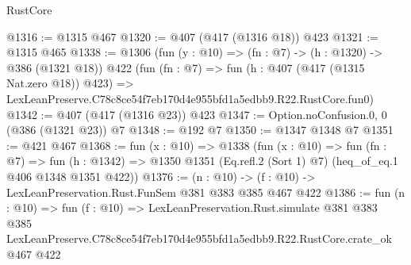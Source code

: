 \begin{lexlean}{RustCore}
\begin{coremodule}
@1316 := @1315 @467
@1320 := @407 (@417 (@1316 @18)) @423
@1321 := @1315 @465
@1338 := @1306
    (fun (y : @10) => (fn : @7) -> (h : @1320) -> @386 (@1321 @18))
    @422
    (fun (fn : @7) =>
    fun (h : @407 (@417 (@1315 Nat.zero @18)) @423) =>
    LexLeanPreserve.C78c8ce54f7eb170d4e955bfd1a5edbb9.R22.RustCore.fun0)
@1342 := @407 (@417 (@1316 @23)) @423
@1347 := Option.noConfusion.{0, 0} (@386 (@1321 @23)) @7
@1348 := @192 @7
@1350 := @1347 @1348 @7
@1351 := @421 @467
@1368 := fun (x : @10) =>
  @1338
    (fun (x : @10) =>
    fun (fn : @7) =>
    fun (h : @1342) => @1350 @1351 (Eq.refl.{2} (Sort 1) @7) (heq_of_eq.{1} @406 @1348 @1351 @422))
@1376 := (n : @10) -> (f : @10) -> LexLeanPreservation.Rust.FunSem @381 @383 @385 @467 @422
@1386 := fun (n : @10) =>
  fun (f : @10) =>
  LexLeanPreservation.Rust.simulate
    @381
    @383
    @385
    LexLeanPreserve.C78c8ce54f7eb170d4e955bfd1a5edbb9.R22.RustCore.crate_ok
    @467
    @422
\end{coremodule}
\end{lexlean}
